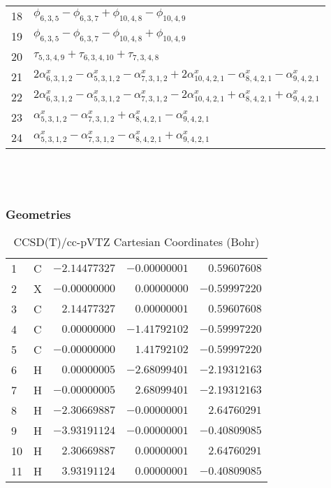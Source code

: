 \documentclass[10pt,oneside]{article}
\begin{document}
\begin{table}[h!]
\begin{tabular}{ll}
  18  & $\phi_{6,3,5} - \phi_{6,3,7} + \phi_{10,4,8} - \phi_{10,4,9}$ \\
  19  & $\phi_{6,3,5} - \phi_{6,3,7} - \phi_{10,4,8} + \phi_{10,4,9}$ \\
  20  & $\tau_{5,3,4,9} + \tau_{6,3,4,10} + \tau_{7,3,4,8}$ \\
  21  & $2\alpha^x_{6,3,1,2} - \alpha^x_{5,3,1,2} - \alpha^x_{7,3,1,2} + 2\alpha^x_{10,4,2,1} - \alpha^x_{8,4,2,1} - \alpha^x_{9,4,2,1}$ \\
  22  & $2\alpha^x_{6,3,1,2} - \alpha^x_{5,3,1,2} - \alpha^x_{7,3,1,2} - 2\alpha^x_{10,4,2,1} + \alpha^x_{8,4,2,1} + \alpha^x_{9,4,2,1}$ \\
  23  & $\alpha^x_{5,3,1,2} - \alpha^x_{7,3,1,2} + \alpha^x_{8,4,2,1} - \alpha^x_{9,4,2,1}$ \\
  24  & $\alpha^x_{5,3,1,2} - \alpha^x_{7,3,1,2} - \alpha^x_{8,4,2,1} + \alpha^x_{9,4,2,1}$ \\
\end{tabular}
\end{table}

\clearpage

\subsection{\ \ \ }

\subsubsection*{Geometries}
\begin{table}[h!]
\centering
\caption{CCSD(T)/cc-pVTZ Cartesian Coordinates (Bohr)}
\begin{tabular}{llrrr}
1  & C  & $-2.14477327$ & $-0.00000001$ & $ 0.59607608$ \\
2  & X  & $-0.00000000$ & $ 0.00000000$ & $-0.59997220$ \\
3  & C  & $ 2.14477327$ & $ 0.00000001$ & $ 0.59607608$ \\
4  & C  & $ 0.00000000$ & $-1.41792102$ & $-0.59997220$ \\
5  & C  & $-0.00000000$ & $ 1.41792102$ & $-0.59997220$ \\
6  & H  & $ 0.00000005$ & $-2.68099401$ & $-2.19312163$ \\
7  & H  & $-0.00000005$ & $ 2.68099401$ & $-2.19312163$ \\
8  & H  & $-2.30669887$ & $-0.00000001$ & $ 2.64760291$ \\
9  & H  & $-3.93191124$ & $-0.00000001$ & $-0.40809085$ \\
10 & H  & $ 2.30669887$ & $ 0.00000001$ & $ 2.64760291$ \\
11 & H  & $ 3.93191124$ & $ 0.00000001$ & $-0.40809085$ \\
\end{tabular}
\end{table}
\end{document}
